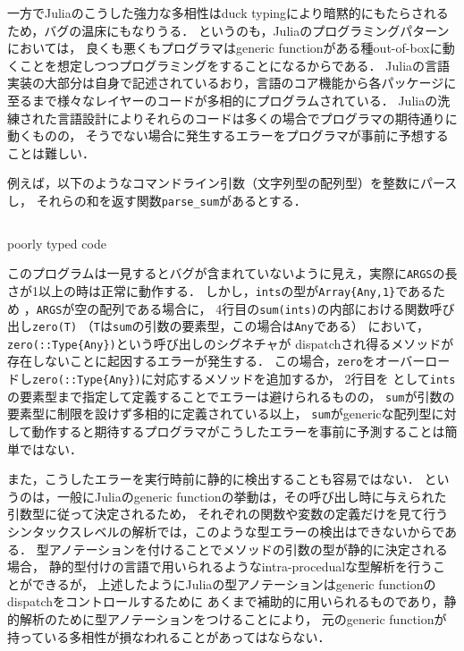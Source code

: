 \vspace{1ex}

一方でJuliaのこうした強力な多相性はduck typingにより暗黙的にもたらされるため，バグの温床にもなりうる．
というのも，Juliaのプログラミングパターンにおいては，
良くも悪くもプログラマはgeneric functionがある種out-of-boxに動くことを想定しつつプログラミングをすることになるからである．
Juliaの言語実装の大部分は自身で記述されているおり，言語のコア機能から各パッケージに至るまで様々なレイヤーのコードが多相的にプログラムされている．
Juliaの洗練された言語設計によりそれらのコードは多くの場合でプログラマの期待通りに動くものの，
そうでない場合に発生するエラーをプログラマが事前に予想することは難しい．

例えば，以下のようなコマンドライン引数（文字列型の配列型）を整数にパースし，
それらの和を返す関数\verb|parse_sum|があるとする．

\begin{listing}[ht]
  \inputminted[frame=lines]{julia}{src/parse_sum.jl}
  \caption{poorly typed code}
  \label{lst:target1}
\end{listing}

このプログラムは一見するとバグが含まれていないように見え，実際に\verb|ARGS|の長さが1以上の時は正常に動作する．
しかし，\verb|ints|の型が\verb|Array{Any,1}|であるため
\footnotemark %
，\verb|ARGS|が空の配列である場合に，
4行目の\verb|sum(ints)|の内部における関数呼び出し\verb|zero(T)|
（\verb|T|は\verb|sum|の引数の要素型，この場合は\verb|Any|である）
において， \verb|zero(::Type{Any})|という呼び出しのシグネチャが
dispatchされ得るメソッドが存在しないことに起因するエラーが発生する．
この場合，\verb|zero|をオーバーロードし\verb|zero(::Type{Any})|に対応するメソッドを追加するか，
2行目を  として\verb|ints|の要素型まで指定して定義することでエラーは避けられるものの，
\verb|sum|が引数の要素型に制限を設けず多相的に定義されている以上，
\verb|sum|がgenericな配列型に対して動作すると期待するプログラマがこうしたエラーを事前に予測することは簡単ではない．


また，こうしたエラーを実行時前に静的に検出することも容易ではない．
というのは，一般にJuliaのgeneric functionの挙動は，その呼び出し時に与えられた引数型に従って決定されるため，
それぞれの関数や変数の定義だけを見て行うシンタックスレベルの解析では，このような型エラーの検出はできないからである．
型アノテーションを付けることでメソッドの引数の型が静的に決定される場合，
静的型付けの言語で用いられるようなintra-procedualな型解析を行うことができるが，
上述したようにJuliaの型アノテーションはgeneric functionのdispatchをコントロールするために
あくまで補助的に用いられるものであり，静的解析のために型アノテーションをつけることにより，
元のgeneric functionが持っている多相性が損なわれることがあってはならない．

